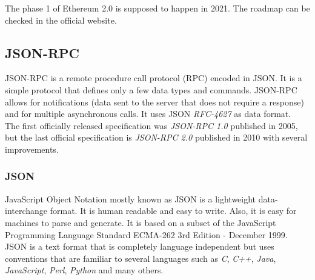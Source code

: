 \documentclass[a4paper, 12pt]{article} %
\begin{document}
            The phase 1 of Ethereum 2.0 is supposed to happen in 2021. The roadmap can be checked in the official website\cite{eth2Roadmap}.
            

    \subsection{JSON-RPC}
        JSON-RPC is a remote procedure call protocol (RPC) encoded in JSON. It is a simple protocol that defines only a few data types and commands. JSON-RPC allows for notifications (data sent to the server that does not require a response) and for multiple asynchronous calls. It uses JSON \textit{RFC-4627}\cite{rfc4627} as data format.\\
        
        The first officially released specification was \textit{JSON-RPC 1.0}\cite{json-rpc-1} published in 2005, but the last official specification is \textit{JSON-RPC 2.0}\cite{json-rpc-2} published in 2010 with several improvements.
        
        \subsubsection{JSON}
            JavaScript Object Notation mostly known as JSON is a lightweight data-interchange format. It is human readable and easy to write. Also, it is easy for machines to parse and generate. It is based on a subset of the JavaScript Programming Language Standard ECMA-262 3rd Edition - December 1999. JSON is a text format that is completely language independent but uses conventions that are familiar to several languages such as \textit{C}, \textit{C++}, \textit{Java}, \textit{JavaScript}, \textit{Perl}, \textit{Python} and many others.\\
                        
\end{document}
